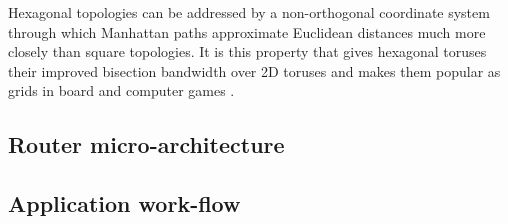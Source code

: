 			Hexagonal topologies can be addressed by a non-orthogonal coordinate
			system through which Manhattan paths approximate Euclidean distances much
			more closely than square topologies. It is this property that gives
			hexagonal toruses their improved bisection bandwidth over 2D toruses and
			makes them popular as grids in board and computer games \cite{patel15}.
		
		\subsection{Router micro-architecture}
		\subsection{Application work-flow}
